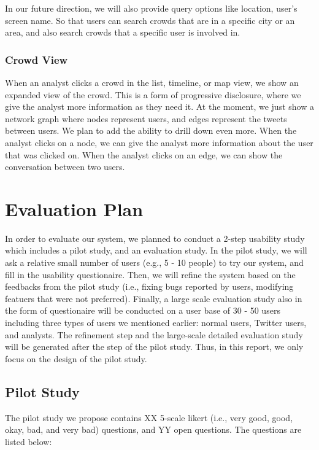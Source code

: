 \documentclass{sig-alternate}
\begin{document}
In our future direction, we will also provide query options like location, user's
screen name. So that users can search crowds that are in a specific city or an 
area, and also search crowds that a specific user is involved in.

\subsubsection{Crowd View}
When an analyst clicks a crowd in the list, timeline, or map view, we show an
expanded view of the crowd. This is a form of progressive disclosure, where we
give the analyst more information as they need it.  At the moment, we just show
a network graph where nodes represent users, and edges represent the tweets
between users. We plan to add the ability to drill down even more.  When the
analyst clicks on a node, we can give the analyst more information about the
user that was clicked on. When the analyst clicks on an edge, we can show the
conversation between two users.

\section{Evaluation Plan}
In order to evaluate our system, we planned to conduct a 2-step usability study
which includes a pilot study, and an evaluation study. In the pilot study, we
will ask a relative small number of users (e.g., 5 - 10 people) to try our
system, and fill in the usability questionaire. Then, we will refine the system
based on the feedbacks from the pilot study (i.e., fixing bugs reported by users,
modifying featuers that were not preferred). Finally, a large scale evaluation
study also in the form of questionaire will be conducted on a user base of 30 -
50 users including three types of users we mentioned earlier: normal users, 
Twitter users, and analysts. The refinement step and the large-scale detailed
evaluation study will be generated after the step of the pilot study. Thus, in
this report, we only focus on the design of the pilot study.

\subsection{Pilot Study}

The pilot study we propose contains XX 5-scale likert (i.e., very good, good,
okay, bad, and very bad) questions, and YY open questions. The questions are
listed below:
\end{document}
